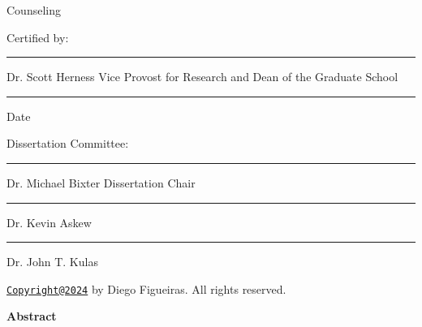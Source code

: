 \documentclass[
  man]{apa7}
\begin{document}
\begin{multicols}{2}  


\newline
Counseling

\vskip 0.6in

Certified by:

\vskip 0.6in  

\linespread{1.0}\selectfont
\rule{6cm}{0.2mm}
\newline
Dr. Scott Herness
\newline
Vice Provost for Research and
\newline
Dean of the Graduate School

\vskip 0.3in

\rule{6cm}{0.2mm}
\newline
Date

\columnbreak

Dissertation Committee:

\vskip 0.6in

\rule{6cm}{0.2mm}
\newline
Dr. Michael Bixter
\newline
Dissertation Chair

\vskip 0.6in

\rule{6cm}{0.2mm}
\newline
Dr. Kevin Askew

\vskip 0.6in

\rule{6cm}{0.2mm}
\newline
Dr. John T. Kulas


\end{multicols}

\newpage
{}
\renewcommand{\headrulewidth}{0pt}
\renewcommand{\footrulewidth}{0pt}

\begin{center}

\phantom{i'm a ghost}

\vskip 1.6in

\href{mailto:Copyright@2024}{\nolinkurl{Copyright@2024}} by Diego Figueiras. All rights reserved.

\end{center}

\newpage
{}
\renewcommand{\headrulewidth}{0pt}
\renewcommand{\footrulewidth}{0pt}

\begin{center}

\textbf{Abstract}

\end{center}
\end{document}
